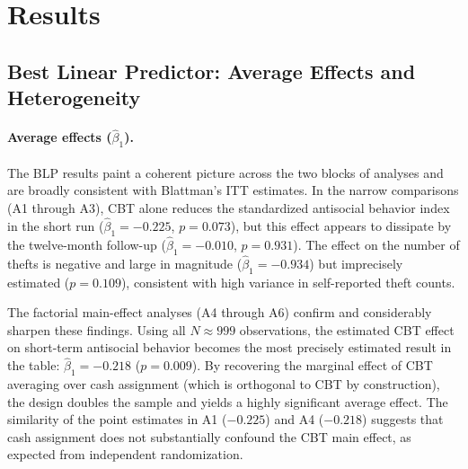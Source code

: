 \documentclass[11pt]{article}
\begin{document}
\section{Results}
\label{sec:results}


\subsection{Best Linear Predictor: Average Effects and Heterogeneity}

\begin{table}[H]
\centering
\caption{Best Linear Predictor results}
\label{tab:blp}

\end{table}

\paragraph{Average effects ($\hat\beta_1$).}
The BLP results paint a coherent picture across the two blocks of analyses and are broadly consistent with Blattman's ITT estimates. In the narrow comparisons (A1 through A3), CBT alone reduces the standardized antisocial behavior index in the short run ($\hat\beta_1 = -0.225$, $p = 0.073$), but this effect appears to dissipate by the twelve-month follow-up ($\hat\beta_1 = -0.010$, $p = 0.931$). The effect on the number of thefts is negative and large in magnitude ($\hat\beta_1 = -0.934$) but imprecisely estimated ($p = 0.109$), consistent with high variance in self-reported theft counts.

The factorial main-effect analyses (A4 through A6) confirm and considerably sharpen these findings. Using all $N\approx 999$ observations, the estimated CBT effect on short-term antisocial behavior becomes the most precisely estimated result in the table: $\hat\beta_1 = -0.218$ ($p = 0.009$). %
By recovering the marginal effect of CBT averaging over cash assignment (which is orthogonal to CBT by construction), the design doubles the sample and yields a highly significant average effect.
The similarity of the point estimates in A1 ($-0.225$) and A4 ($-0.218$) suggests that cash assignment does not substantially confound the CBT main effect, as expected from independent randomization.
\end{document}
